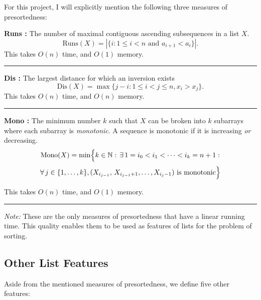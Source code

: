 \documentclass[twocolumn]{article}
\renewcommand{\leq}{\leqslant}
\newcommand{\vsp}{\vspace{0.5em}}
\newcommand{\ruler}{
    \vspace{1em}
    \hrule
    \vspace{1em}
}
\begin{document}
For this project, I will explicitly mention the following three measures of presortedness:

\vsp


\noindent \textbf{Runs \cite{Knuth1973}:}
The number of maximal contiguous ascending subsequences in a list $X$. 
\[
\text{Runs}(X) = \left|\{i : 1 \leq i < n \text{ and } a_{i+1} < a_i\}\right|.
\]
This takes $O(n)$ time, and $O(1)$ memory.

\ruler

\vsp

\noindent \textbf{Dis \cite{adaptivesortingsurvey}:}
The largest distance for which an inversion exists
\[
\text{Dis}(X) = \operatorname{max}\{j - i : 1 \leq i < j \leq n, x_i > x_j\}.
\]
This takes $O(n)$ time, and $O(n)$ memory.

\ruler

\vsp

\noindent \textbf{Mono \cite{zhang2016sortrace}:} 
The minimum number $k$ such that $X$ can be broken into $k$ subarrays where each subarray is \emph{monotonic}. A sequence is monotonic if it is increasing \emph{or} decreasing.
\[
\operatorname{Mono}(X)
=
\min\Bigl\{
k \in \mathbb{N}
:\,\exists\,1 = i_{0} < i_{1} < \cdots < i_{k} = n+1 :
\Bigr.
\]
\[
\Bigl.
\forall\, j \in \{1,\dots,k\},
(X_{i_{j-1}},\,X_{i_{j-1}+1},\dots,X_{i_{j}-1})
\text{ is monotonic}
\Bigr\}
\]

This takes $O(n)$ time, and $O(1)$ memory.
\ruler

\vsp

\noindent \textit{Note: }These are the only measures of presortedness that have a linear running time. This quality enables them to be used as features of lists for the problem of sorting.

\subsection{Other List Features}
Aside from the mentioned measures of presortedness, we define five other features:
\end{document}
